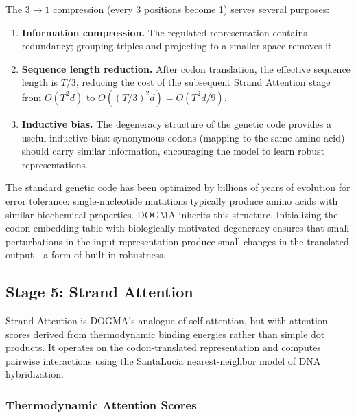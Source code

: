 The $3 \to 1$ compression (every 3 positions become 1) serves several purposes:
\begin{enumerate}[leftmargin=1.5em]
\item \textbf{Information compression.} The regulated representation contains redundancy; grouping triples and projecting to a smaller space removes it.
\item \textbf{Sequence length reduction.} After codon translation, the effective sequence length is $T/3$, reducing the cost of the subsequent Strand Attention stage from $O(T^2 d)$ to $O((T/3)^2 d) = O(T^2 d / 9)$.
\item \textbf{Inductive bias.} The degeneracy structure of the genetic code provides a useful inductive bias: synonymous codons (mapping to the same amino acid) should carry similar information, encouraging the model to learn robust representations.
\end{enumerate}

\begin{bioinsight}
The standard genetic code has been optimized by billions of years of evolution for error tolerance: single-nucleotide mutations typically produce amino acids with similar biochemical properties. DOGMA inherits this structure. Initializing the codon embedding table with biologically-motivated degeneracy ensures that small perturbations in the input representation produce small changes in the translated output---a form of built-in robustness.
\end{bioinsight}

\subsection{Stage 5: Strand Attention}
\label{sec:stage-strand-attention}

Strand Attention is DOGMA's analogue of self-attention, but with attention scores derived from thermodynamic binding energies rather than simple dot products. It operates on the codon-translated representation and computes pairwise interactions using the SantaLucia nearest-neighbor model of DNA hybridization.

\subsubsection{Thermodynamic Attention Scores}


